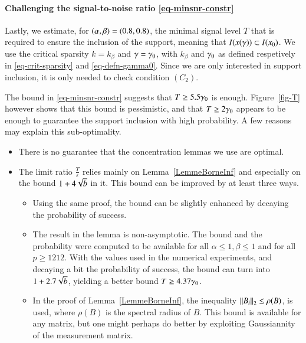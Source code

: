 

\paragraph{Challenging the signal-to-noise ratio \eqref{eq-minsnr-constr}}

Lastly, we estimate, for $(\alpha,\beta) = (0.8,0.8)$, the minimal signal level $T$ that is required to ensure the inclusion of the support, meaning that $I(x(\gamma)) \subset I(x_0)$. We use the critical sparsity $k=k_\beta$ and $\gamma=\gamma_0$, with $k_\beta$ and $\gamma_0$ as defined respetively in \eqref{eq-crit-sparsity} and \eqref{eq-defn-gamma0}. Since we are only interested in support inclusion, it is only needed to check condition $(C_2)$. 

The bound in \eqref{eq-minsnr-constr} suggests that $T \geq 5.5 \gamma_0$ is enough. Figure~\ref{fig-T} however shows that this bound is pessimistic, and that $T \geq 2 \gamma_0$ appears to be enough to guarantee the support inclusion with high probability. A few reasons may explain this sub-optimality.
\begin{itemize}
\item There is no guarantee that the concentration lemmas we use are optimal.
\item The limit ratio $\frac{T}{\varepsilon}$ relies mainly on Lemma~\ref{LemmeBorneInf} and especially on the bound $1+4\sqrt{b}$ in it. 
This bound can be improved by at least three ways.
\begin{itemize}
\item Using the same proof, the bound can be slightly enhanced by decaying the probability of success. 
\item The result in the lemma is non-asymptotic. The bound and the probability were computed to be available for all $\alpha\leq 1,\beta\leq 1$ and for all $p\geq 1212$. With the values used in the numerical experiments, and decaying a bit the probability of success, the bound can turn into $1+2.7\sqrt{b}$, yielding a better bound $T\geq 4.37 \gamma_0$.
\item In the proof of Lemma~\ref{LemmeBorneInf}, the inequality $\left\Vert{B_i}\right\Vert_2\leq \rho(B)$, is used, where $\rho(B)$ is the spectral radius of $B$. This bound is available for any matrix, but one might perhaps do better by exploiting Gaussiannity of the measurement matrix.
\end{itemize}   
\end{itemize}


